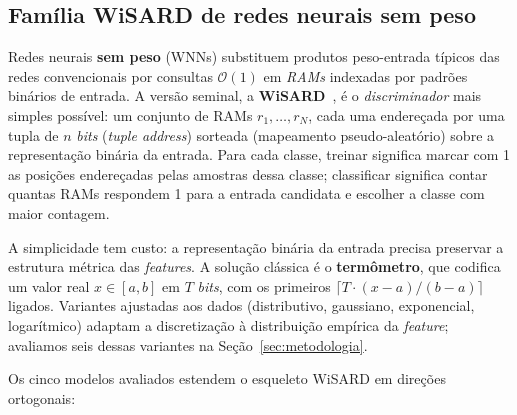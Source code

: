 \subsection{Família WiSARD de redes neurais sem peso}

Redes neurais \textbf{sem peso} (WNNs) substituem produtos
peso-entrada típicos das redes convencionais por consultas
$\mathcal{O}(1)$ em \emph{RAMs} indexadas por padrões binários de
entrada. A versão seminal, a \textbf{WiSARD}~\cite{aleksander1984wisard},
é o \emph{discriminador} mais simples possível: um conjunto de
RAMs $r_1, \dots, r_N$, cada uma endereçada por uma tupla de
$n$ \emph{bits} (\emph{tuple address}) sorteada (mapeamento
pseudo-aleatório) sobre a representação binária da entrada. Para cada
classe, treinar significa marcar com 1 as posições endereçadas pelas
amostras dessa classe; classificar significa contar quantas RAMs
respondem 1 para a entrada candidata e escolher a classe com maior
contagem.

A simplicidade tem custo: a representação binária da entrada precisa
preservar a estrutura métrica das \emph{features}. A solução clássica
é o \textbf{termômetro}, que codifica um valor real $x \in [a, b]$ em
$T$ \emph{bits}, com os primeiros $\lceil T \cdot (x-a)/(b-a) \rceil$
ligados. Variantes ajustadas aos dados (distributivo, gaussiano,
exponencial, logarítmico) adaptam a discretização à distribuição
empírica da \emph{feature}; avaliamos seis dessas variantes na
Seção~\ref{sec:metodologia}.

Os cinco modelos avaliados estendem o esqueleto WiSARD em direções
ortogonais:

